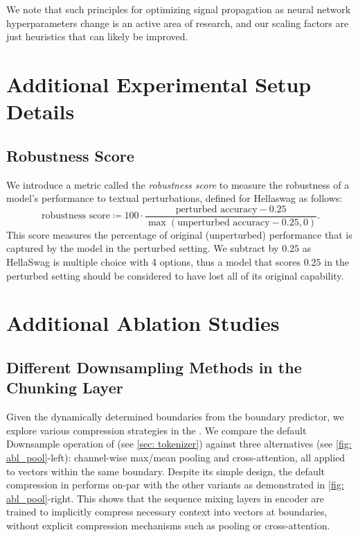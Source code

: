 We note that such principles for optimizing signal propagation as neural network hyperparameters change is an active area of research, and our scaling factors are just heuristics that can likely be improved.

\section{Additional Experimental Setup Details}

\subsection{Robustness Score}
\label{sec: appendix-robustness_score}

We introduce a metric called the \emph{robustness score} to measure the robustness of a model's performance to textual perturbations, defined for Hellaswag as follows: \[
    \text{robustness score} \coloneqq 100 \cdot \dfrac{\text{perturbed accuracy} - 0.25}{\max(\text{unperturbed accuracy} - 0.25, 0)}.
\]
This score measures the percentage of original (unperturbed) performance that is captured by the model in the perturbed setting. We subtract by $0.25$ as HellaSwag is multiple choice with 4 options, thus a model that scores $0.25$ in the perturbed setting should be considered to have lost all of its original capability.

\section{Additional Ablation Studies}


\subsection{Different Downsampling Methods in the Chunking Layer}
\label{sec: Appendix-Various-Compression}
Given the dynamically determined boundaries from the boundary predictor, we explore various compression strategies in the \chunk{}.
We compare the default Downsample operation of \model{} (see \cref{sec: tokenizer}) against three alternatives (see \cref{fig: abl_pool}-left): channel-wise max/mean pooling and cross-attention, all applied to vectors within the same boundary.
Despite its simple design, the default compression in \model{} performs on-par with the other variants as demonstrated in \cref{fig: abl_pool}-right.
This shows that the sequence mixing layers in encoder are trained to implicitly compress necessary context into vectors at boundaries, without explicit compression mechanisms such as pooling or cross-attention.

